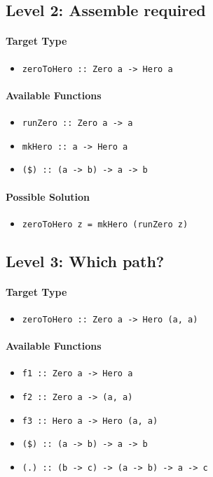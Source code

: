 \documentclass[preprint,12pt]{elsarticle}
\begin{document}
\subsection{Level 2: Assemble required}

\paragraph{Target Type} 
\begin{itemize}
    \item \texttt{zeroToHero :: Zero a -> Hero a}
\end{itemize}

\paragraph{Available Functions} 
\begin{itemize}
    \item \texttt{runZero :: Zero a -> a}
    \item \texttt{mkHero :: a -> Hero a}
    \item \texttt{(\$) :: (a -> b) -> a -> b}
\end{itemize}

\paragraph{Possible Solution} 
\begin{itemize}
    \item \texttt{zeroToHero z = mkHero (runZero z)}
\end{itemize}

\subsection{Level 3: Which path?}
\paragraph{Target Type } 
\begin{itemize}
    \item \texttt{zeroToHero :: Zero a -> Hero (a, a)}
\end{itemize}

\paragraph{Available Functions} 
\begin{itemize}
    \item \texttt{f1 :: Zero a -> Hero a}
    \item \texttt{f2 :: Zero a -> (a, a)}
    \item \texttt{f3 :: Hero a -> Hero (a, a)}
    \item \texttt{(\$) :: (a -> b) -> a -> b}
    \item \texttt{(.) :: (b -> c) -> (a -> b) -> a -> c}
\end{itemize}
\end{document}

